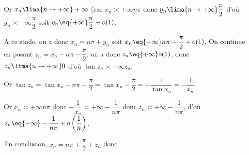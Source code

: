 \documentclass[a4paper,french,bookmarks]{article}
\begin{document}
\begin{enumerate}
{\begin{enumerate}
            Or $x_n \lima{n \to +\infty} +\infty$ (car $x_n \asymp{+\infty} n\pi$ donc $y_n \lima{n \to +\infty} \dfrac{\pi}{2}$ d'où $y_n \asymp{+\infty} \dfrac{\pi}{2}$ soit $y_n \eq{+\infty} \dfrac{\pi}{2} + o(1)$.
        
            A ce stade, on a donc $x_n = n\pi + y_n$ soit $x_n \eq{+\infty} n\pi + \dfrac{\pi}{2} + o(1)$.
            On continue en posant $z_n = x_n - n\pi - \dfrac{\pi}{2}$, on a donc $z_n \eq{+\infty} o(1)$, donc $z_n \lima{n \to +\infty} 0$ d'où $\tan{z_n} \asymp{+\infty} z_n$.
        
            Or $\tan{z_n} = \tan{x_n - n\pi - \dfrac{\pi}{2}} = \tan{x_n - \dfrac{\pi}{2}} = -\dfrac{1}{\tan{x_n}} = -\dfrac{1}{x_n}$.
        
            Or $x_n \asymp{+\infty} n\pi$ donc $-\dfrac{1}{x_n} \asymp{+\infty} - \dfrac{1}{n\pi}$ donc $z_n \asymp{+\infty} -\dfrac{1}{n\pi}$, d'où $z_n \eq{+\infty} -\dfrac{1}{n\pi} + o\left(\dfrac{1}{n}\right)$.
         
            En conclusion, $x_n = n\pi + \dfrac{\pi}{2} + z_n$ donc 
        \end{enumerate}
    }
    
\end{enumerate}
\end{document}
